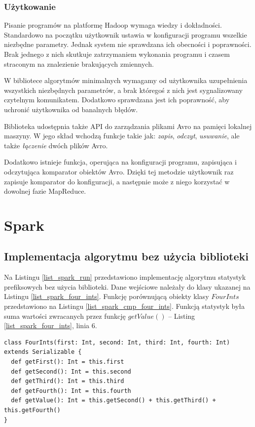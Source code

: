 \documentclass[magisterska]{pracamgr}
\begin{document}
\subsubsection{Użytkowanie} \label{hadoop_uzytkowanie}

Pisanie programów na platformę Hadoop wymaga wiedzy i dokładności. Standardowo na początku użytkownik ustawia w konfiguracji programu wszelkie niezbędne parametry. Jednak system nie sprawdzana ich obecności i poprawności. Brak jednego z nich skutkuje zatrzymaniem wykonania programu i czasem straconym na znalezienie brakujących zmiennych.

W bibliotece algorytmów minimalnych wymagamy od użytkownika uzupełnienia wszystkich niezbędnych parametrów, a brak któregoś z nich jest sygnalizowany czytelnym komunikatem. Dodatkowo sprawdzana jest ich poprawność, aby uchronić użytkownika od banalnych błędów.

Biblioteka udostępnia także API do zarządzania plikami Avro na pamięci lokalnej maszyny. W jego skład wchodzą funkcje takie jak: \textit{zapis}, \textit{odczyt}, \textit{usuwanie}, ale także \textit{łączenie} dwóch plików Avro.

Dodatkowo istnieje funkcja, operująca na konfiguracji programu, zapisująca i odczytująca komparator obiektów Avro. Dzięki tej metodzie użytkownik raz zapisuje komparator do konfiguracji, a następnie może z niego korzystać w dowolnej fazie MapReduce.

\newpage
\section{Spark} \label{spark}

\subsection{Implementacja algorytmu bez użycia biblioteki} \label{sbub}
Na Listingu \ref{list_spark_run} przedstawiono implementację algorytmu statystyk prefiksowych bez użycia biblioteki. Dane wejściowe należały do klasy ukazanej na Listingu \ref{list_spark_four_ints}. Funkcję porównującą obiekty klasy \(FourInts\) przedstawiono na Listingu \ref{list_spark_cmp_four_ints}. Funkcją statystyk była suma wartości zwracanych przez funkcję \(getValue()\) -- Listing \ref{list_spark_four_ints}, linia 6.

\begin{lstlisting}[language=SmallJava,firstnumber=1,label=list_spark_four_ints,caption=Klasa danych wejściowych do algorytmu statystyk prefiksowych]
class FourInts(first: Int, second: Int, third: Int, fourth: Int) extends Serializable {
  def getFirst(): Int = this.first
  def getSecond(): Int = this.second
  def getThird(): Int = this.third
  def getFourth(): Int = this.fourth
  def getValue(): Int = this.getSecond() + this.getThird() + this.getFourth()
}
\end{lstlisting}
\end{document}
